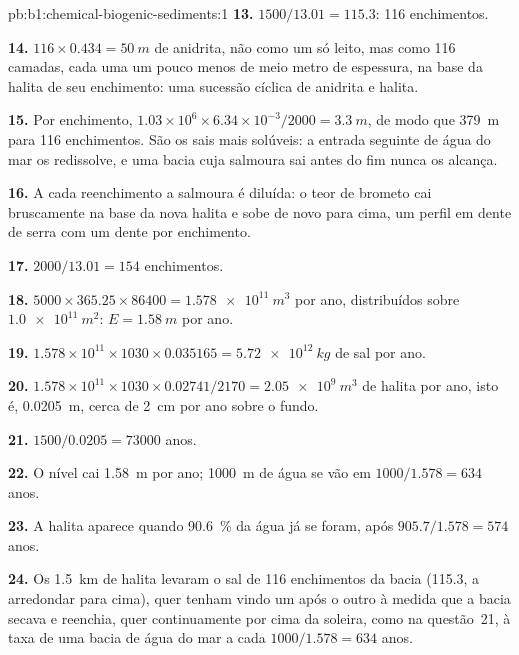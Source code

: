 \begin{solution}{pb:b1:chemical-biogenic-sediments:1}
\textbf{13.} $1500/13.01 = 115.3$: 116 enchimentos.

\textbf{14.} $116\times0.434 = \qty{50}{m}$ de anidrita, não como um só leito, mas como
116 camadas, cada uma um pouco menos de meio metro de espessura, na base da halita de
seu enchimento: uma sucessão cíclica de anidrita e halita.

\textbf{15.} Por enchimento, $1.03\times10^6\times6.34\times10^{-3}/2000 =
\qty{3.3}{m}$, de modo que \qty{379}{m} para 116 enchimentos. São os sais mais solúveis: a
entrada seguinte de água do mar os redissolve, e uma bacia cuja salmoura sai antes do fim
nunca os alcança.

\textbf{16.} A cada reenchimento a salmoura é diluída: o teor de brometo cai bruscamente na
base da nova halita e sobe de novo para cima, um perfil em dente de serra com um dente por
enchimento.

\textbf{17.} $2000/13.01 = 154$ enchimentos.

\textbf{18.} $5000\times365.25\times86400 = \qty{1.578e11}{m^3}$ por ano, distribuídos sobre
$\qty{1.0e11}{m^2}$: $E = \qty{1.58}{m}$ por ano.

\textbf{19.} $1.578\times10^{11}\times1030\times0.035165 = \qty{5.72e12}{kg}$ de sal por ano.

\textbf{20.} $1.578\times10^{11}\times1030\times0.02741/2170 =
\qty{2.05e9}{m^3}$ de halita por ano, isto é, \qty{0.0205}{m}, cerca de \qty{2}{cm} por ano
sobre o fundo.

\textbf{21.} $1500/0.0205 = \num{73000}$ anos.

\textbf{22.} O nível cai \qty{1.58}{m} por ano; \qty{1000}{m} de água se vão em
$1000/1.578 = 634$ anos.

\textbf{23.} A halita aparece quando \qty{90.6}{\%} da água já se foram, após
$905.7/1.578 = 574$ anos.

\textbf{24.} Os \qty{1.5}{km} de halita levaram o sal de 116 enchimentos da bacia
(115.3, a arredondar para cima), quer tenham vindo um após o outro à medida que a bacia
secava e reenchia, quer continuamente por cima da soleira, como na questão~21, à taxa de
uma bacia de água do mar a cada $1000/1.578 = 634$ anos.
\end{solution}

